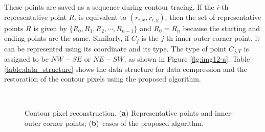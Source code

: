 \documentclass[sensors,article,accept,moreauthors,pdftex,10pt,a4paper]{mdpi}
\begin{document}

These points are saved as a sequence during contour tracing. If the $i$-th representative point $R_i$ is equivalent to $(r_{i,x}, r_{i,y})$, then the set of representative points $R$ is given by $\{R_0, R_1, R_2, \cdots , R_{n-1}\}$ and $R_0 = R_n$ because the starting and ending points are the same. Similarly, if $C_j$ is the $j$-th inner-outer corner point, it can be represented using its coordinate and its type. The type of point $C_{j,T}$ is assigned to be $NW-SE$ or $NE-SW$, as shown in Figure \ref{fig:img12-a}. Table \ref{table:data_structure} shows the data structure for data compression and the restoration of the contour pixels using the proposed algorithm.

\begin{figure}[H]
	\centering
	 \\
	\caption{Contour pixel reconstruction. (\textbf{a}) Representative points and inner-outer corner points; (\textbf{b})~cases of the proposed algorithm.}
	\label{fig:image12}
\end{figure}
\unskip
\end{document}
